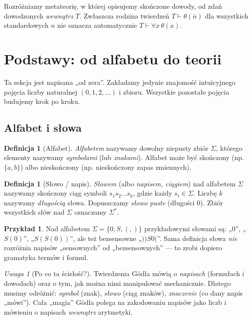 \documentclass[11pt,a4paper]{article}
\numberwithin{equation}{section}
\theoremstyle{plain}
\theoremstyle{definition}
\newtheorem{definicja}[twierdzenie]{Definicja}
\newtheorem{przyklad}[twierdzenie]{Przykład}
\theoremstyle{remark}
\newtheorem{uwaga}[twierdzenie]{Uwaga}
\begin{document}
Rozróżniamy metateorię, w której opisujemy skończone dowody, od zdań dowodzonych \emph{wewnątrz} $T$. Zwłaszcza rodzina twierdzeń $T\vdash\theta(\overline n)$ dla wszystkich standardowych $n$ nie oznacza automatycznie $T\vdash\forall x\,\theta(x)$.

\section{Podstawy: od alfabetu do teorii}\label{sec:podstawy}
Ta sekcja jest napisana „od zera”. Zakładamy jedynie znajomość intuicyjnego pojęcia liczby naturalnej $(0,1,2,\ldots)$ i zbioru. Wszystkie pozostałe pojęcia budujemy krok po kroku.

\subsection*{Alfabet i słowa}\label{sec:alfabet-slowa}
\begin{definicja}[Alfabet]\label{res:2:1}
\emph{Alfabetem} nazywamy dowolny niepusty zbiór $\Sigma$, którego elementy nazywamy \emph{symbolami} (lub \emph{znakami}). Alfabet może być skończony (np. $\{a,b\}$) albo nieskończony (np. nieskończony zapas zmiennych).
\end{definicja}

\begin{definicja}[Słowo / napis]\label{res:2:2}
\emph{Słowem} (albo \emph{napisem, ciągiem}) nad alfabetem $\Sigma$ nazywamy skończony ciąg symboli $s_1s_2\ldots s_k$, gdzie każdy $s_i\in\Sigma$. Liczbę $k$ nazywamy \emph{długością} słowa. Dopuszczamy \emph{słowo puste} (długości $0$). Zbiór wszystkich słów nad $\Sigma$ oznaczamy $\Sigma^*$.
\end{definicja}

\begin{przyklad}\label{res:2:3}
Nad alfabetem $\Sigma=\{0,S,(,)\}$ przykładowymi słowami są: „$0$”, „$S(0)$”, „$S(S(0))$”, ale też bezsensowne „$))S0($”. Sama definicja słowa \emph{nie} rozróżnia napisów „sensownych” od „bezsensownych” --- to zrobi dopiero gramatyka termów i formuł.
\end{przyklad}

\begin{uwaga}[Po co ta ścisłość?]\label{res:2:4}
Twierdzenia Gödla mówią o \emph{napisach} (formułach i dowodach) oraz o tym, jak można nimi manipulować mechanicznie. Dlatego musimy odróżnić: \emph{symbol} (znak), \emph{słowo} (ciąg znaków), \emph{znaczenie} (co dany napis „mówi”). Cała „magia” Gödla polega na zakodowaniu napisów jako liczb i mówieniu o napisach \emph{wewnątrz} arytmetyki.
\end{uwaga}
\end{document}
